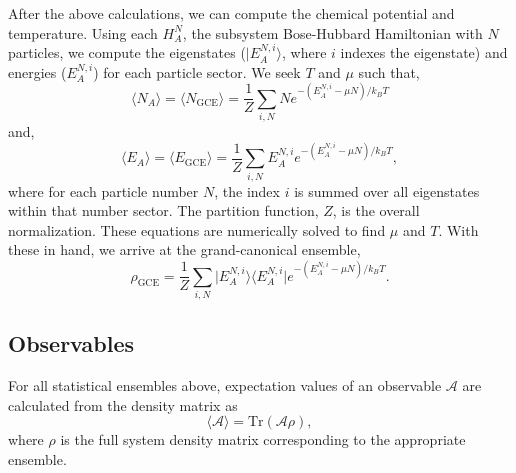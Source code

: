 After the above calculations, we can compute the chemical potential and temperature. Using each $H_A^N$, the subsystem Bose-Hubbard Hamiltonian with $N$ particles, we compute the eigenstates ($\vert E^{N,i}_A \rangle$, where $i$ indexes the eigenstate) and energies ($E^{N,i}_A$) for each particle sector. We seek $T$ and $\mu$ such that, 
\[
\langle N_A \rangle = \langle N_{\mathrm{GCE}} \rangle = \frac{1}{Z}\sum_{i,N} N e^{-(E^{N,i}_A-\mu N)/k_B T}
\]
and, 
\[
\langle E_A \rangle = \langle E_{\mathrm{GCE}} \rangle = \frac{1}{Z} \sum_{i,N} E^{N,i}_A e^{-(E^{N,i}_A-\mu N)/k_B T},
\]
where for each particle number $N$, the index $i$ is summed over all eigenstates within that number sector. The partition function, $Z$, is the overall normalization. These equations are numerically solved to find $\mu$ and $T$. With these in hand, we arrive at the grand-canonical ensemble, 
\[
\rho_{\mathrm{GCE}} = \frac{1}{Z}\sum_{i,N} \vert E^{N,i}_A \rangle \langle E^{N,i}_A \vert e^{-(E^{N,i}_A-\mu N)/k_B T}.
\]


\subsection*{Observables}

For all statistical ensembles above, expectation values of an observable $\mathcal A$ are calculated from the density matrix as 
\[
\langle \mathcal A \rangle = \mathrm{Tr} (\mathcal A \rho),
\]
where $\rho$ is the full system density matrix corresponding to the appropriate ensemble.
